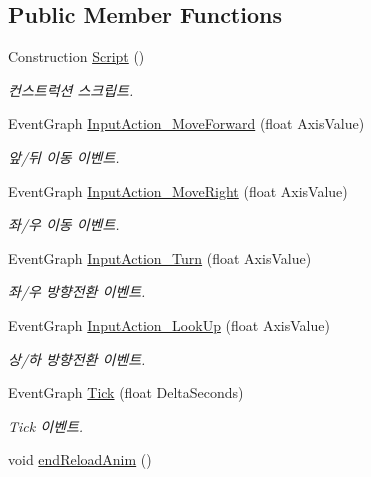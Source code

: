 \subsection*{Public Member Functions}
\begin{DoxyCompactItemize}
\item 
Construction \hyperlink{class_player___person_aed98240a8754d1b4fee94a426717d99f}{Script} ()
\begin{DoxyCompactList}\small\item\em 컨스트럭션 스크립트. \end{DoxyCompactList}\item 
Event\+Graph \hyperlink{class_player___person_a955d5e05a9f36c5554ed9fe48c3a7200}{Input\+Action\+\_\+\+Move\+Forward} (float Axis\+Value)
\begin{DoxyCompactList}\small\item\em 앞/뒤 이동 이벤트. \end{DoxyCompactList}\item 
Event\+Graph \hyperlink{class_player___person_af9b6b3a41cfcf5ad41eb49108a580e4a}{Input\+Action\+\_\+\+Move\+Right} (float Axis\+Value)
\begin{DoxyCompactList}\small\item\em 좌/우 이동 이벤트. \end{DoxyCompactList}\item 
Event\+Graph \hyperlink{class_player___person_a95d1ad3a1cc2e766d8d20816b625b8c0}{Input\+Action\+\_\+\+Turn} (float Axis\+Value)
\begin{DoxyCompactList}\small\item\em 좌/우 방향전환 이벤트. \end{DoxyCompactList}\item 
Event\+Graph \hyperlink{class_player___person_ae3f98b4ac80e453c32b261afa2a2f933}{Input\+Action\+\_\+\+Look\+Up} (float Axis\+Value)
\begin{DoxyCompactList}\small\item\em 상/하 방향전환 이벤트. \end{DoxyCompactList}\item 
Event\+Graph \hyperlink{class_player___person_a7219dd86f30bced16e6b570315d9e74f}{Tick} (float Delta\+Seconds)
\begin{DoxyCompactList}\small\item\em Tick 이벤트. \end{DoxyCompactList}\item 
void \hyperlink{class_player___person_a9b61abe3ce82c372cfd2764c3555519e}{end\+Reload\+Anim} ()

\end{DoxyCompactItemize}
